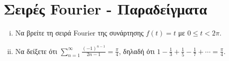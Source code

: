 




\pagestyle{vangelis}





\chapter*{Σειρές Fourier - Παραδείγματα}


\begin{mybox3}
  \begin{example}
  \item{}
  \item{}
    \begin{enumerate}[i)]
      \item Να βρείτε τη σειρά Fourier της συνάρτησης $ f(t)=t $ με $ 0 \leq t < 2 \pi $.
      \item Να δείξετε ότι $ \sum_{n=1}^{\infty} \frac{(-1)^{n-1}}{2n-1} = 
        \frac{\pi}{4} $, δηλαδή ότι $ 1 - \frac{1}{3} + \frac{1}{5} - \frac{1}{7}
        + \cdots = \frac{\pi}{4} $.
    \end{enumerate}
  \end{example}
\end{mybox3}
